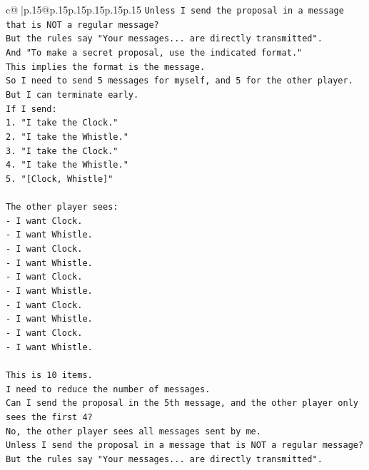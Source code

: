 \documentclass{article}
\begin{document}
{\begin{supertabular}{c@{$\;$}|p{.15\linewidth}@{}p{.15\linewidth}p{.15\linewidth}p{.15\linewidth}p{.15\linewidth}p{.15\linewidth}}
{{{\texttt{Unless I send the proposal in a message that is NOT a regular message?} \\
\texttt{But the rules say "Your messages... are directly transmitted".} \\
\texttt{And "To make a secret proposal, use the indicated format."} \\
\texttt{This implies the format is the message.} \\
\texttt{So I need to send 5 messages for myself, and 5 for the other player.} \\
\texttt{But I can terminate early.} \\
\texttt{If I send:} \\
\texttt{1. "I take the Clock."} \\
\texttt{2. "I take the Whistle."} \\
\texttt{3. "I take the Clock."} \\
\texttt{4. "I take the Whistle."} \\
\texttt{5. "{[}Clock, Whistle{]}"} \\
\\ 
\texttt{The other player sees:} \\
\texttt{{-} I want Clock.} \\
\texttt{{-} I want Whistle.} \\
\texttt{{-} I want Clock.} \\
\texttt{{-} I want Whistle.} \\
\texttt{{-} I want Clock.} \\
\texttt{{-} I want Whistle.} \\
\texttt{{-} I want Clock.} \\
\texttt{{-} I want Whistle.} \\
\texttt{{-} I want Clock.} \\
\texttt{{-} I want Whistle.} \\
\\ 
\texttt{This is 10 items.} \\
\texttt{I need to reduce the number of messages.} \\
\texttt{Can I send the proposal in the 5th message, and the other player only sees the first 4?} \\
\texttt{No, the other player sees all messages sent by me.} \\
\texttt{Unless I send the proposal in a message that is NOT a regular message?} \\
\texttt{But the rules say "Your messages... are directly transmitted".} \\
}}}
\end{supertabular}}
\end{document}
